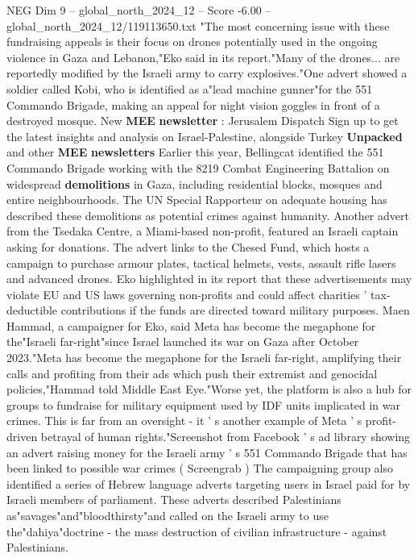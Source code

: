 \begin{textsample}{NEG Dim 9 – global\_north\_2024\_12 – Score -6.00 – global\_north\_2024\_12/119113650.txt}  \label{ex:f9_neg_118}
"The most concerning issue with these fundraising appeals is their focus on drones potentially used in the ongoing violence in Gaza and Lebanon,"Eko said in its report."Many of the drones... are reportedly modified by the Israeli army to carry explosives."One advert showed a soldier called Kobi, who is identified as a"lead machine gunner"for the 551 Commando Brigade, making an appeal for night vision goggles in front of a destroyed mosque.
New \textbf{MEE} \textbf{newsletter} : Jerusalem Dispatch Sign up to get the latest insights and analysis on Israel-Palestine, alongside Turkey \textbf{Unpacked} and other \textbf{MEE} \textbf{newsletters} Earlier this year, Bellingcat identified the 551 Commando Brigade working with the 8219 Combat Engineering Battalion on widespread \textbf{demolitions} in Gaza, including residential blocks, mosques and entire neighbourhoods.
The UN Special Rapporteur on adequate housing has described these demolitions as potential crimes against humanity.
Another advert from the Tsedaka Centre, a Miami-based non-profit, featured an Israeli captain asking for donations.
The advert links to the Chesed Fund, which hosts a campaign to purchase armour plates, tactical helmets, vests, assault rifle lasers and advanced drones.
Eko highlighted in its report that these advertisements may violate EU and US laws governing non-profits and could affect charities ' tax-deductible contributions if the funds are directed toward military purposes.
Maen Hammad, a campaigner for Eko, said Meta has become the megaphone for the"Israeli far-right"since Israel launched its war on Gaza after October 2023."Meta has become the megaphone for the Israeli far-right, amplifying their calls and profiting from their ads which push their extremist and genocidal policies,"Hammad told Middle East Eye."Worse yet, the platform is also a hub for groups to fundraise for military equipment used by IDF units implicated in war crimes.
This is far from an oversight - it ' s another example of Meta ' s profit-driven betrayal of human rights."Screenshot from Facebook ' s ad library showing an advert raising money for the Israeli army ' s 551 Commando Brigade that has been linked to possible war crimes ( Screengrab ) The campaigning group also identified a series of Hebrew language adverts targeting users in Israel paid for by Israeli members of parliament.
These adverts described Palestinians as"savages"and"bloodthirsty"and called on the Israeli army to use the"dahiya"doctrine - the mass destruction of civilian infrastructure - against Palestinians.

\end{textsample}

